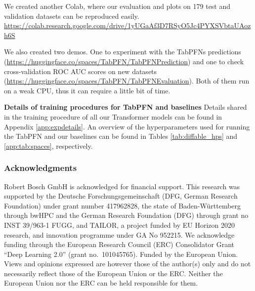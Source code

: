 We created another Colab, where our evaluation and plots on 179 test and validation datasets can be reproduced easily. \url{https://colab.research.google.com/drive/1yUGaAf3D7RSyO5Jc4PYXSVbtaUAozh6S}

We also created two demos. One to experiment with the TabPFNs predictions (\url{https://huggingface.co/spaces/TabPFN/TabPFNPrediction}) and one to check cross-validation ROC AUC scores on new datasets (\url{https://huggingface.co/spaces/TabPFN/TabPFNEvaluation}). Both of them run on a weak CPU, thus it can require a little bit of time. 

\textbf{Details of training procedures for TabPFN and baselines} Details shared in the training procedure of all our Transformer models can be found in Appendix \ref{app:expdetails}.
An overview of the hyperparameters used for running the TabPFN and our baselines can be found in Tables \ref{tab:diffable_hps} and \ref{app:tab:spaces}, respectively.

\subsubsection*{Acknowledgments}
Robert Bosch GmbH is acknowledged for financial support. This research was supported by the Deutsche Forschungsgemeinschaft (DFG, German Research Foundation) under grant number 417962828, the state of Baden-W\"{u}rttemberg through bwHPC and the German Research Foundation (DFG) through grant no INST 39/963-1 FUGG, and TAILOR, a project funded by EU Horizon 2020 research, and innovation programme under GA No 952215. We acknowledge funding through the European Research Council (ERC) Consolidator Grant ``Deep Learning 2.0'' (grant no.\ 101045765). Funded by the European Union. Views and opinions expressed are however those of the author(s) only and do not necessarily reflect those of the European Union or the ERC. Neither the European Union nor the ERC can be held responsible for them.

\begin{center}\end{center}


